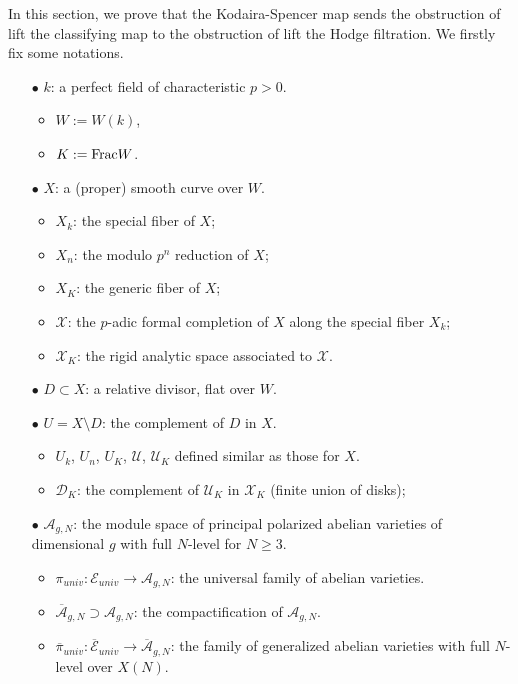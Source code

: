 \documentclass[12pt,twoside]{book}
\theoremstyle{plain}
\theoremstyle{definition}
\theoremstyle{remark}
\numberwithin{equation}{section}
\begin{document}
In this section, we prove that the Kodaira-Spencer map sends the obstruction of lift the classifying map to the obstruction of lift the Hodge filtration. We firstly fix some notations.
\begin{itemize}
\item[$\bullet$]$k$: a perfect field of characteristic $p > 0$.
\begin{itemize}
\item $W := W(k)$,
\item $K := {\rm Frac} W$.
\end{itemize}
\item[$\bullet$]$X$: a (proper) smooth curve over $W$.
\begin{itemize}
\item $X_k$: the special fiber of $X$;
\item $X_n$: the modulo $p^n$ reduction of $X$;
\item $X_K$: the generic fiber of $X$;
\item $\mathcal X$: the $p$-adic formal completion of $X$ along the special fiber $X_k$;
\item $\mathcal X_K$: the rigid analytic space associated to $\mathcal X$.
\end{itemize}
\item[$\bullet$] $D\subset X$: a relative divisor, flat over $W$.
\item[$\bullet$] $U=X\setminus D$: the complement of $D$ in $X$.
\begin{itemize}
\item $U_k$, $U_n$, $U_K$, $\mathcal U$, $\mathcal U_K$ defined similar as those for $X$.
\item $\mathcal D_K$: the complement of $\mathcal U_K$ in $\mathcal X_K$ (finite union of disks);
\end{itemize}
\item [$\bullet$] $\mathcal A_{g,N}$: the module space of principal polarized abelian varieties of dimensional $g$ with full $N$-level for $N\geq 3$.
\begin{itemize}
\item $\pi_{univ}\colon\mathcal E_{univ}\rightarrow \mathcal A_{g,N}$: the universal family of abelian varieties.
\item $\overline{\mathcal A}_{g,N}\supset \mathcal A_{g,N}$: the compactification of $\mathcal A_{g,N}$.
\item $\overline \pi_{univ}\colon \overline{\mathcal E}_{univ}\rightarrow \overline{\mathcal A}_{g,N}$: the family of generalized abelian varieties with full $N$-level over $X(N)$.

\end{itemize}
\end{itemize}
\end{document}
